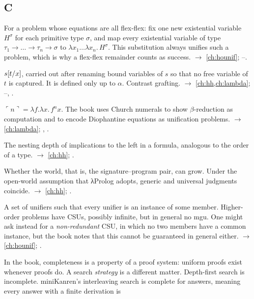 \subsection*{C}
\begin{glossarylist}
\item[Canonical substitution] For a problem whose equations are all flex-flex: fix one new existential
  variable $H^{\sigma}$ for each primitive type $\sigma$, and map every existential variable of type
  $\tau_1\to\dots\to\tau_n\to\sigma$ to $\lambda x_1\dots\lambda x_n.\,H^{\sigma}$. This substitution always unifies
  such a problem, which is why a flex-flex remainder counts as success. $\rightarrow$ \cref{ch:hounif};
  --.
\item[Capture-avoiding substitution] $s[t/x]$, carried out after renaming bound variables of $s$ so that
  no free variable of $t$ is captured. It is defined only up to $\alpha$. Contrast grafting.
  $\rightarrow$ \cref{ch:hh,ch:lambda}; --, .
\item[Church numeral] $\ulcorner n\urcorner=\lambda f.\lambda x.\,f^n x$. The book uses Church numerals to show
  $\beta$-reduction as computation and to encode Diophantine equations as unification problems.
  $\rightarrow$ \cref{ch:lambda}; , .
\item[Clausal order] The nesting depth of implications to the left in a formula, analogous to the order of a type.
  $\rightarrow$ \cref{ch:hh}; .
\item[Closed-world / open-world assumption] Whether the world, that is, the signature--program pair, can grow. Under
  the open-world assumption that λProlog adopts, generic and universal judgments coincide.
  $\rightarrow$ \cref{ch:hh}; .
\item[Complete set of unifiers (CSU)] A set of unifiers such that every unifier is an instance of some member.
  Higher-order problems have CSUs, possibly infinite, but in general no mgu. One might ask instead for a \emph{non-redundant}
  CSU, in which no two members have a common instance, but the book notes that this cannot be guaranteed in general
  either. $\rightarrow$ \cref{ch:hounif}; .
\item[Completeness (of a search strategy)] In the book, completeness is a property of a proof system: uniform proofs
  exist whenever proofs do. A search \emph{strategy} is a different matter. Depth-first search is incomplete.
  miniKanren's interleaving search is complete for answers, meaning every answer with a finite derivation is

\end{glossarylist}
